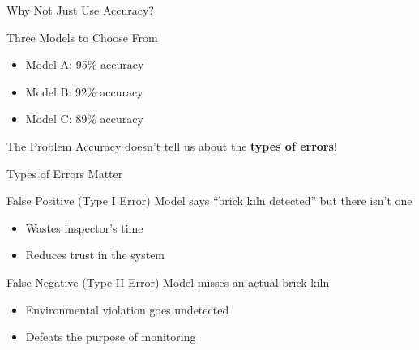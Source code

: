 \documentclass{beamer}
\begin{document}
\begin{frame}{Why Not Just Use Accuracy?}
\begin{alertblock}{Three Models to Choose From}
\begin{itemize}
    \item Model A: 95\% accuracy
    \item Model B: 92\% accuracy
    \item Model C: 89\% accuracy
\end{itemize}
\end{alertblock}

\vspace{0.5cm}
\pause

\begin{keypointsbox}{The Problem}
Accuracy doesn't tell us about the \textbf{types of errors}!
\end{keypointsbox}
\end{frame}

\begin{frame}{Types of Errors Matter}
\begin{examplebox}{False Positive (Type I Error)}
Model says ``brick kiln detected'' but there isn't one
\begin{itemize}
    \item Wastes inspector's time
    \item Reduces trust in the system
\end{itemize}
\end{examplebox}

\vspace{0.3cm}

\begin{examplebox}{False Negative (Type II Error)}
Model misses an actual brick kiln
\begin{itemize}
    \item Environmental violation goes undetected
    \item Defeats the purpose of monitoring
\end{itemize}
\end{examplebox}
\end{frame}
\end{document}
